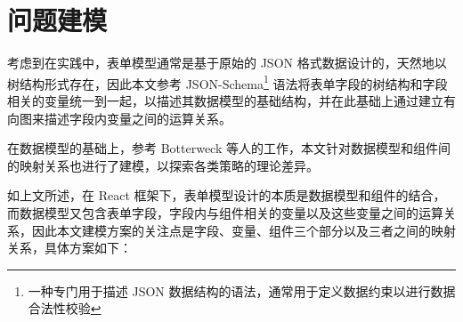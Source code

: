 \documentclass[winfonts,master,twoside]{njuthesis}
\begin{document}
\section{问题建模}\label{problem-modeling}

考虑到在实践中，表单模型通常是基于原始的 JSON 格式数据设计的，天然地以树结构形式存在，因此本文参考 JSON-Schema\footnote{一种专门用于描述 JSON 数据结构的语法，通常用于定义数据约束以进行数据合法性校验} 语法将表单字段的树结构和字段相关的变量统一到一起\cite{pezoa2016foundations}，以描述其数据模型的基础结构，并在此基础上通过建立有向图来描述字段内变量之间的运算关系。

在数据模型的基础上，参考 Botterweck 等人的工作\cite{botterweck2006model}，本文针对数据模型和组件间的映射关系也进行了建模，以探索各类策略的理论差异。

如上文所述，在 React 框架下，表单模型设计的本质是数据模型和组件的结合，而数据模型又包含表单字段，字段内与组件相关的变量以及这些变量之间的运算关系，因此本文建模方案的关注点是字段、变量、组件三个部分以及三者之间的映射关系，具体方案如下：
\end{document}
